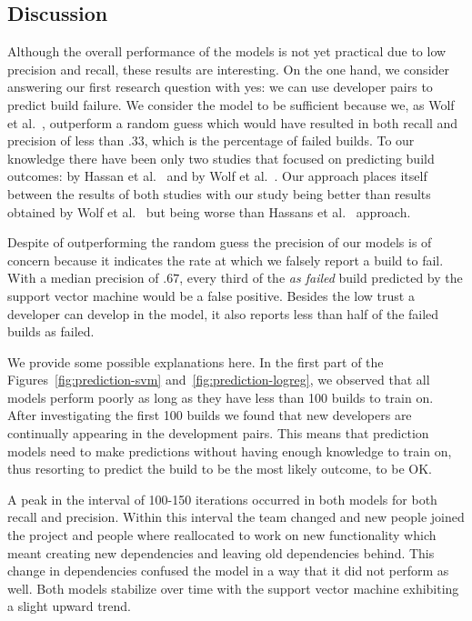 \documentclass[12pt,oneside]{book}
\begin{document}
\subsection{Discussion}
Although the overall performance of the models is not yet practical due to low
precision and recall, these results are interesting. On the one hand, we consider
answering our first research question with yes: we can use developer pairs to
predict build failure. We consider the model to be sufficient because we, as Wolf
et al.~\cite{wolf:icse:2009}, outperform a random guess which would have
resulted in both recall and precision of less than $.33$, which is the percentage of failed
builds. To our knowledge there have been only two studies that focused on
predicting build outcomes: by Hassan et al.~\cite{hassan:ase:2006} and by Wolf et
al.~\cite{wolf:icse:2009}. Our approach places itself between the results of both
studies with our study being better than results obtained by Wolf et
al.~\cite{wolf:icse:2009} but being worse than Hassans et
al.~\cite{hassan:ase:2006} approach.

Despite of outperforming the random guess the precision of our models is of concern because
it indicates the rate at which we falsely report a build to fail. With a median
 precision of $.67$, every third of the \emph{as failed} build predicted by the support
 vector machine would be a false positive. Besides the low trust a developer
 can develop in the model, it also reports less than half of the failed builds
 as failed.


We provide some possible explanations here. In the first part of the
Figures~\ref{fig:prediction-svm} and~\ref{fig:prediction-logreg}, we observed
that all models perform poorly as long as they have less than 100 builds to train
on. After investigating the first 100 builds we found that new
developers are continually appearing in the development pairs. This means that
prediction models need to make predictions without having enough knowledge to
train on, thus resorting to predict the build to be the most likely outcome, to be OK.

A peak in the interval of 100-150 iterations occurred in both models for both recall and precision.
Within this interval the team changed and new people joined the project and people where reallocated to work on new functionality which meant creating new dependencies and leaving old dependencies behind.
This change in dependencies confused the model in a way that it did not perform as well.
Both models stabilize over time with the support vector machine exhibiting a slight upward trend.
\end{document}
